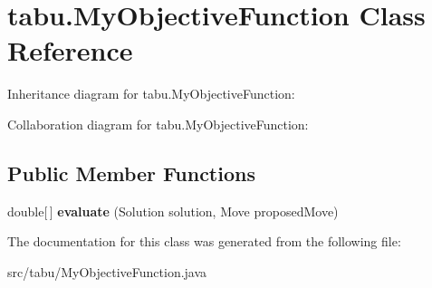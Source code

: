 \hypertarget{classtabu_1_1_my_objective_function}{}\section{tabu.\+My\+Objective\+Function Class Reference}
\label{classtabu_1_1_my_objective_function}


Inheritance diagram for tabu.\+My\+Objective\+Function\+:


Collaboration diagram for tabu.\+My\+Objective\+Function\+:
\subsection*{Public Member Functions}
\begin{DoxyCompactItemize}
\item 
double\mbox{[}$\,$\mbox{]} {\bfseries evaluate} (Solution solution, Move proposed\+Move)\hypertarget{classtabu_1_1_my_objective_function_a7b78bcc5deee19cd9dcd7510c7f2654d}{}\label{classtabu_1_1_my_objective_function_a7b78bcc5deee19cd9dcd7510c7f2654d}

\end{DoxyCompactItemize}


The documentation for this class was generated from the following file\+:\begin{DoxyCompactItemize}
\item 
src/tabu/My\+Objective\+Function.\+java\end{DoxyCompactItemize}
